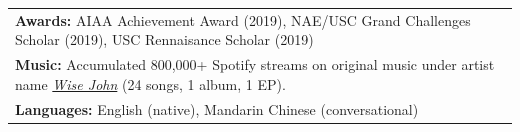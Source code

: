 \documentclass[letterpaper,10pt]{article}
\begin{document}

\begin{tabularx}{\linewidth}{@{}X@{}}
\textbf{Awards:} AIAA Achievement Award (2019), NAE/USC Grand Challenges Scholar (2019), USC Rennaisance Scholar (2019) \\
\textbf{Music:} Accumulated 800,000+ Spotify streams on original music under 
artist name \textit{\href{https://open.spotify.com/artist/13DmASWA762GpdaSAAR90l}{Wise John}} (24 songs, 1 album, 1 EP). \\
\textbf{Languages:} English (native), Mandarin Chinese (conversational)
\end{tabularx}
\end{document}
